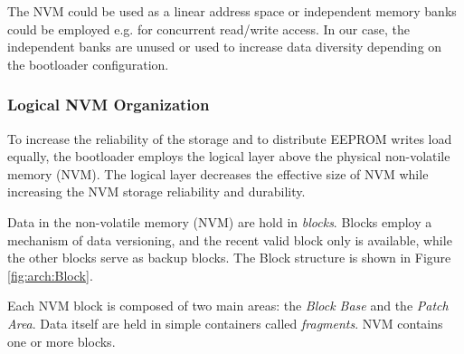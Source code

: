 The NVM could be used as a linear address space or independent memory banks could be employed e.g. for concurrent read/write access.
In our case, the independent banks are unused or used to increase data diversity depending on the bootloader configuration. 

\subsubsection{Logical NVM Organization}\label{sec:arch:EEPROMMap:logical}

To increase the reliability of the storage and to distribute EEPROM writes load equally, the bootloader employs the logical layer above the physical non-volatile memory (NVM). 
The logical layer decreases the effective size of NVM while increasing the NVM storage reliability and durability. 

Data in the non-volatile memory (NVM) are hold in \textit{blocks}. Blocks employ a mechanism of data versioning, 
and the recent valid block only is available, while the other blocks serve as backup blocks. The Block structure is shown in Figure \ref{fig:arch:Block}. 


Each NVM block is composed of two main areas: the \textit{Block Base} and the \textit{Patch Area}. 
Data itself are held in simple containers called \textit{fragments}. NVM contains one or more blocks.

